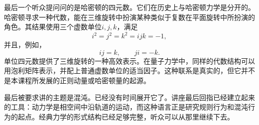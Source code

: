 最后一个听众提问问的是哈密顿的四元数。它们在历史上与哈密顿力学是分开的。哈密顿寻求一种代数，能在三维旋转中扮演某种类似于复数在平面旋转中所扮演的角色。其结果使用三个虚数单位\(i,j,k\)，满足
\begin{equation}
  i^2=j^2=k^2=ijk=-1,
\end{equation}
并且，例如，
\begin{equation}
  ij=k,
  \qquad
  ji=-k.
\end{equation}
单位四元数提供了三维旋转的一种高效表示。在量子力学中，同样的代数结构可以用泡利矩阵表示，并配上普通虚数单位的适当因子。这种联系是真实的，但它并不是本课程所发展的正则动量或哈密顿量的起源。

最后被要求讲的主题是混沌。已经没有时间展开它了。讲座最后回指已经建立起来的工具：动力学是相空间中沿轨道的运动，而这种语言正是研究规则行为和混沌行为的起点。经典力学的形式结构已经足够完整，听众可以从那里继续下去。
